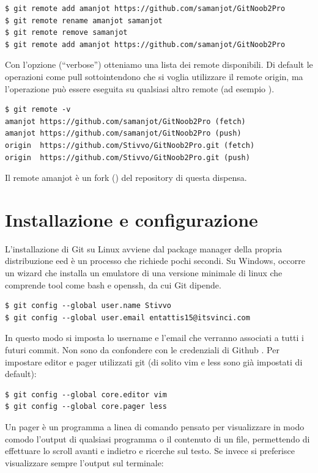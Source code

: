 \documentclass{article}
\begin{document}
\begin{verbatim}
$ git remote add amanjot https://github.com/samanjot/GitNoob2Pro
$ git remote rename amanjot samanjot
$ git remote remove samanjot
$ git remote add amanjot https://github.com/samanjot/GitNoob2Pro
\end{verbatim}

Con l'opzione  (``verbose'') otteniamo una lista dei remote disponibili.
Di default le operazioni come pull sottointendono che si voglia utilizzare il 
remote origin, ma l'operazione può essere eseguita su qualsiasi altro remote
(ad esempio ).

\begin{verbatim}
$ git remote -v
amanjot	https://github.com/samanjot/GitNoob2Pro (fetch)
amanjot	https://github.com/samanjot/GitNoob2Pro (push)
origin	https://github.com/Stivvo/GitNoob2Pro.git (fetch)
origin	https://github.com/Stivvo/GitNoob2Pro.git (push)
\end{verbatim}

Il remote amanjot è un fork () del repository di questa dispensa.

\section{Installazione e configurazione\label{configurazione}}
L'installazione di Git su Linux avviene dal package manager della propria
distribuzione eed è un processo che richiede pochi secondi.
Su Windows, occorre  un wizard
che installa un emulatore di una versione minimale di linux che comprende tool
come bash e openssh, da cui Git dipende.

\begin{verbatim}
$ git config --global user.name Stivvo
$ git config --global user.email entattis15@itsvinci.com
\end{verbatim}

In questo modo si imposta lo username e l'email che verranno associati a tutti i
futuri commit. Non sono da confondere con le credenziali di Github .
Per impostare editor e pager utilizzati git (di solito vim e less sono già 
impostati di default):

\begin{verbatim}
$ git config --global core.editor vim
$ git config --global core.pager less
\end{verbatim}

Un pager è un programma a linea di comando pensato per visualizzare in modo comodo
l'output di qualsiasi programma o il contenuto di un file, permettendo di
effettuare lo scroll avanti e indietro e ricerche sul testo.
Se invece si preferisce visualizzare sempre l'output sul terminale:
\end{document}
